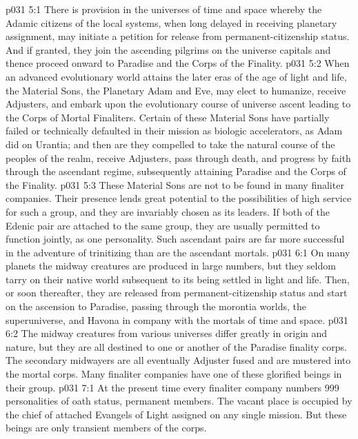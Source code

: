 \vs p031 5:1 There is provision in the universes of time and space whereby the Adamic citizens of the local systems, when long delayed in receiving planetary assignment, may initiate a petition for release from permanent\hyp{}citizenship status. And if granted, they join the ascending pilgrims on the universe capitals and thence proceed onward to Paradise and the Corps of the Finality.
\vs p031 5:2 When an advanced evolutionary world attains the later eras of the age of light and life, the Material Sons, the Planetary Adam and Eve, may elect to humanize, receive Adjusters, and embark upon the evolutionary course of universe ascent leading to the Corps of Mortal Finaliters. Certain of these Material Sons have partially failed or technically defaulted in their mission as biologic accelerators, as Adam did on Urantia; and then are they compelled to take the natural course of the peoples of the realm, receive Adjusters, pass through death, and progress by faith through the ascendant regime, subsequently attaining Paradise and the Corps of the Finality.
\vs p031 5:3 These Material Sons are not to be found in many finaliter companies. Their presence lends great potential to the possibilities of high service for such a group, and they are invariably chosen as its leaders. If both of the Edenic pair are attached to the same group, they are usually permitted to function jointly, as one personality. Such ascendant pairs are far more successful in the adventure of trinitizing than are the ascendant mortals.
\vs p031 6:1 On many planets the midway creatures are produced in large numbers, but they seldom tarry on their native world subsequent to its being settled in light and life. Then, or soon thereafter, they are released from permanent\hyp{}citizenship status and start on the ascension to Paradise, passing through the morontia worlds, the superuniverse, and Havona in company with the mortals of time and space.
\vs p031 6:2 The midway creatures from various universes differ greatly in origin and nature, but they are all destined to one or another of the Paradise finality corps. The secondary midwayers are all eventually Adjuster fused and are mustered into the mortal corps. Many finaliter companies have one of these glorified beings in their group.
\vs p031 7:1 At the present time every finaliter company numbers 999 personalities of oath status, permanent members. The vacant place is occupied by the chief of attached Evangels of Light assigned on any single mission. But these beings are only transient members of the corps.
